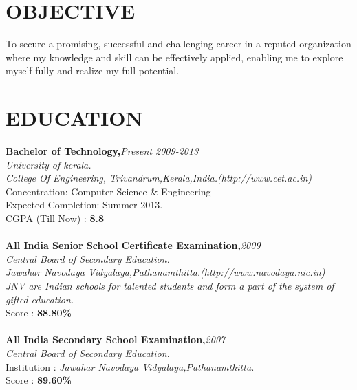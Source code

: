 \documentclass[line,margin]{res}
\begin{document}
\address{\large abilngeorge@gmail.com}
\address{\large (+91)9497359361}

\thispagestyle{empty} %

\begin{resume}
  
  \section{OBJECTIVE}       
  To secure a promising, successful and challenging career in a reputed organization where my knowledge and skill can be effectively applied, enabling me to explore myself fully and realize my full potential.\\
  
  \section{EDUCATION} 
          {\bf Bachelor of Technology,}\hfill {\it Present 2009-2013}\\
          {\it University of kerala.}\\ 
          {\it College Of Engineering, Trivandrum,Kerala,India.\hfill(http://www.cet.ac.in)} \\
          Concentration: Computer Science \& Engineering \\
          Expected Completion: Summer 2013.\\ 
          CGPA (Till Now) : {\bf 8.8} \\\\
          {\bf All India Senior School Certificate Examination,}\hfill {\it 2009}\\        
          {\it Central Board of Secondary Education.}\\
          {\it Jawahar Navodaya Vidyalaya,Pathanamthitta.}\hfill{\it(http://www.navodaya.nic.in)}\\
          {\it JNV are Indian schools for talented students and form a part of the system of gifted education.}\\
          Score       : {\bf 88.80\% } \\\\
          {\bf All India Secondary School Examination,}\hfill {\it 2007}\\
          {\it Central Board of Secondary Education.}\\
          Institution : {\it Jawahar Navodaya Vidyalaya,Pathanamthitta.} \\ 
          Score       : {\bf 89.60\% } \\

\end{resume}
\end{document}
